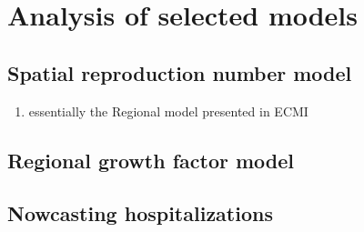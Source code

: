 \chapter{Analysis of selected models}
\label{cha:analysis_of_selected_models}

\section{Spatial reproduction number model}%
\label{sec:spatial_reproduction_number_model}

\begin{enumerate}
    \item essentially the Regional model presented in ECMI
\end{enumerate}

\section{Regional growth factor model}%
\label{sec:regional_growth_factor_model}

\section{Nowcasting hospitalizations}%
\label{sec:nowcasting_hospitalizations}

